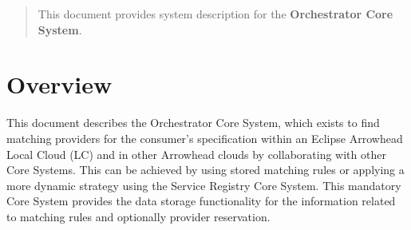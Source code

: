 \documentclass[a4paper]{arrowhead}
\begin{document}
\ArrowheadDate{\today}
\ArrowheadSetup

\begin{center}
  \vspace*{1cm}
  \huge{\arrowtitle}

  \vspace*{0.2cm}
  \LARGE{\arrowtype}
  \vspace*{1cm}

  \vspace*{\fill}


  \vspace*{1cm}
  \vspace*{\fill}

  \begin{abstract}
    This document provides system description for the \textbf{Orchestrator Core System}.
  \end{abstract}

  \vspace*{1cm}

 \end{center}

\newpage

\tableofcontents
\newpage

\section{Overview}
\label{sec:overview}
\color{black}
This document describes the Orchestrator Core System, which exists to find matching providers for the consumer's specification within an Eclipse Arrowhead Local Cloud (LC) and in other Arrowhead clouds by collaborating with other Core Systems. This can be achieved by using stored matching rules or applying a more dynamic strategy using the Service Registry Core System. This mandatory Core System provides the data storage functionality for the information related to matching rules and optionally provider reservation.
\end{document}
